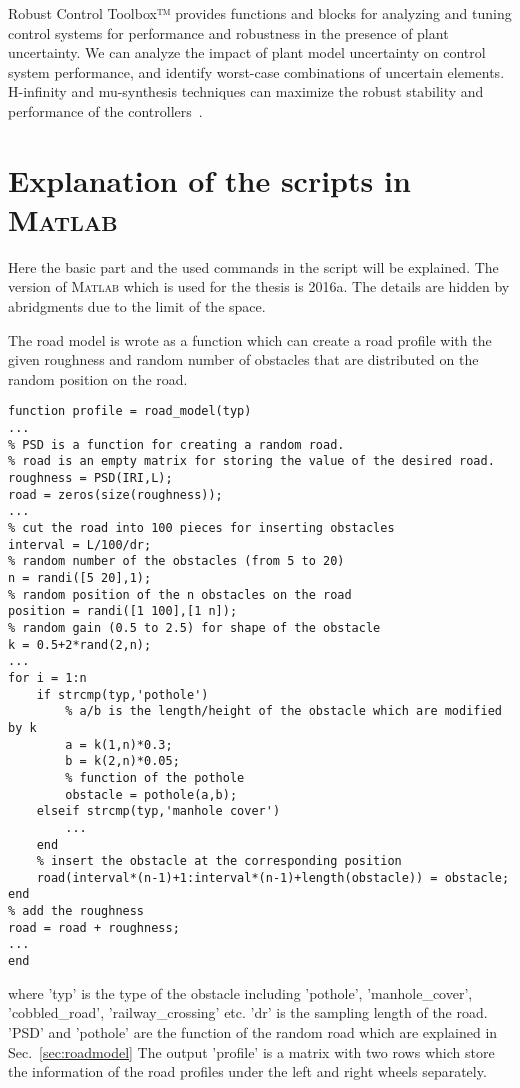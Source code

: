 Robust Control Toolbox™ provides functions and blocks for analyzing and tuning control systems for performance and robustness in the presence of plant uncertainty.
%
We can analyze the impact of plant model uncertainty on control system performance, and identify worst-case combinations of uncertain elements.
%
H-infinity and mu-synthesis techniques can maximize the robust stability and performance of the controllers~\cite{Mathworks}.

\section{Explanation of the scripts in \textsc{Matlab}}

Here the basic part and the used commands in the script will be explained.
%
The version of \textsc{Matlab} which is used for the thesis is 2016a.
%
The details are hidden by abridgments due to the limit of the space.

The road model is wrote as a function which can create a road profile with the given roughness and random number of obstacles that are distributed on the random position on the road.

\begin{lstlisting}[caption={Function of the road model},label=code:road]
function profile = road_model(typ)
...
% PSD is a function for creating a random road.
% road is an empty matrix for storing the value of the desired road.
roughness = PSD(IRI,L);
road = zeros(size(roughness));
...
% cut the road into 100 pieces for inserting obstacles
interval = L/100/dr;
% random number of the obstacles (from 5 to 20)
n = randi([5 20],1);
% random position of the n obstacles on the road
position = randi([1 100],[1 n]);
% random gain (0.5 to 2.5) for shape of the obstacle
k = 0.5+2*rand(2,n);
...
for i = 1:n
    if strcmp(typ,'pothole')
        % a/b is the length/height of the obstacle which are modified by k
        a = k(1,n)*0.3;
        b = k(2,n)*0.05;
        % function of the pothole
        obstacle = pothole(a,b);
    elseif strcmp(typ,'manhole cover')
        ...
    end
    % insert the obstacle at the corresponding position
    road(interval*(n-1)+1:interval*(n-1)+length(obstacle)) = obstacle;
end
% add the roughness
road = road + roughness;
...
end

\end{lstlisting}

where 'typ' is the type of the obstacle including 'pothole', 'manhole\_cover', 'cobbled\_road', 'railway\_crossing' etc.
%
'dr' is the sampling length of the road. 
%
'PSD' and 'pothole' are the function of the random road which are explained in Sec.~\ref{sec:roadmodel}
%
The output 'profile' is a matrix with two rows which store the information of the road profiles under the left and right wheels separately.

